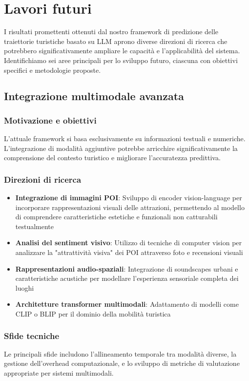 \chapter{Lavori futuri}

I risultati promettenti ottenuti dal nostro framework di predizione delle traiettorie turistiche basato su LLM aprono diverse direzioni di ricerca che potrebbero significativamente ampliare le capacità e l'applicabilità del sistema. Identifichiamo sei aree principali per lo sviluppo futuro, ciascuna con obiettivi specifici e metodologie proposte.

\section{Integrazione multimodale avanzata}

\subsection{Motivazione e obiettivi}
L'attuale framework si basa esclusivamente su informazioni testuali e numeriche. L'integrazione di modalità aggiuntive potrebbe arricchire significativamente la comprensione del contesto turistico e migliorare l'accuratezza predittiva.

\subsection{Direzioni di ricerca}
\begin{itemize}
\item \textbf{Integrazione di immagini POI}: Sviluppo di encoder vision-language per incorporare rappresentazioni visuali delle attrazioni, permettendo al modello di comprendere caratteristiche estetiche e funzionali non catturabili testualmente
\item \textbf{Analisi del sentiment visivo}: Utilizzo di tecniche di computer vision per analizzare la "attrattività visiva" dei POI attraverso foto e recensioni visuali
\item \textbf{Rappresentazioni audio-spaziali}: Integrazione di soundscapes urbani e caratteristiche acustiche per modellare l'esperienza sensoriale completa dei luoghi
\item \textbf{Architetture transformer multimodali}: Adattamento di modelli come CLIP o BLIP per il dominio della mobilità turistica
\end{itemize}

\subsection{Sfide tecniche}
Le principali sfide includono l'allineamento temporale tra modalità diverse, la gestione dell'overhead computazionale, e lo sviluppo di metriche di valutazione appropriate per sistemi multimodali.

